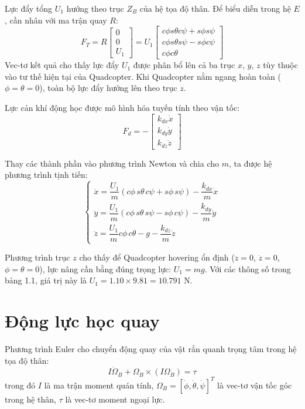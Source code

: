 \documentclass[12pt,a4paper]{report}
\begin{document}
Lực đẩy tổng $U_1$ hướng theo trục $Z_B$ của hệ tọa độ thân. Để biểu diễn trong hệ $E$, cần nhân với ma trận quay $R$:
\begin{equation}
F_T = R \begin{bmatrix} 0 \\ 0 \\ U_1 \end{bmatrix}
= U_1 \begin{bmatrix} c\phi s\theta c\psi + s\phi s\psi \\[6pt] c\phi s\theta s\psi - s\phi c\psi \\[6pt] c\phi c\theta \end{bmatrix}
\end{equation}
Vec-tơ kết quả cho thấy lực đẩy $U_1$ được phân bổ lên cả ba trục $x$, $y$, $z$ tùy thuộc vào tư thế hiện tại của Quadcopter. Khi Quadcopter nằm ngang hoàn toàn ($\phi = \theta = 0$), toàn bộ lực đẩy hướng lên theo trục $z$.

Lực cản khí động học được mô hình hóa tuyến tính theo vận tốc:
\begin{equation}
F_d = -\begin{bmatrix} k_{dx} \dot{x} \\[6pt] k_{dy} \dot{y} \\[6pt] k_{dz} \dot{z} \end{bmatrix}
\end{equation}

Thay các thành phần vào phương trình Newton và chia cho $m$, ta được hệ phương trình tịnh tiến:
\begin{equation}
\begin{cases}
\ddot{x} = \dfrac{U_1}{m} (c\phi \, s\theta \, c\psi + s\phi \, s\psi) - \dfrac{k_{dx}}{m} \dot{x} \\[10pt]
\ddot{y} = \dfrac{U_1}{m} (c\phi \, s\theta \, s\psi - s\phi \, c\psi) - \dfrac{k_{dy}}{m} \dot{y} \\[10pt]
\ddot{z} = \dfrac{U_1}{m} c\phi \, c\theta - g - \dfrac{k_{dz}}{m} \dot{z}
\end{cases}
\end{equation}

Phương trình trục $z$ cho thấy để Quadcopter hovering ổn định ($\ddot{z} = 0$, $\dot{z} = 0$, $\phi = \theta = 0$), lực nâng cần bằng đúng trọng lực: $U_1 = mg$. Với các thông số trong bảng 1.1, giá trị này là $U_1 = 1.10 \times 9.81 = 10.791$ N.

\section{Động lực học quay}
Phương trình Euler cho chuyển động quay của vật rắn quanh trọng tâm trong hệ tọa độ thân:
\begin{equation}
I \dot{\Omega}_B + \Omega_B \times (I \Omega_B) = \tau
\end{equation}
trong đó $I$ là ma trận moment quán tính, $\Omega_B = [\dot{\phi}, \dot{\theta}, \dot{\psi}]^T$ là vec-tơ vận tốc góc trong hệ thân, $\tau$ là vec-tơ moment ngoại lực.
\end{document}
